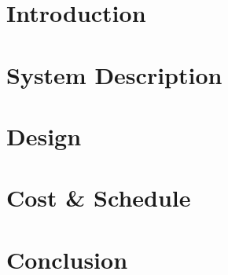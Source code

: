 \documentclass[12pt]{article}
\begin{document}

\clearpage
\section{Introduction}

\clearpage
\section{System Description}


\clearpage
\section{Design}


\clearpage
\section{Cost \& Schedule}


\clearpage
\section{Conclusion}


\clearpage
\printbibliography[heading=bibintoc, title={References}]

\begin{appendices}
    \clearpage
    
\end{appendices}
\end{document}
